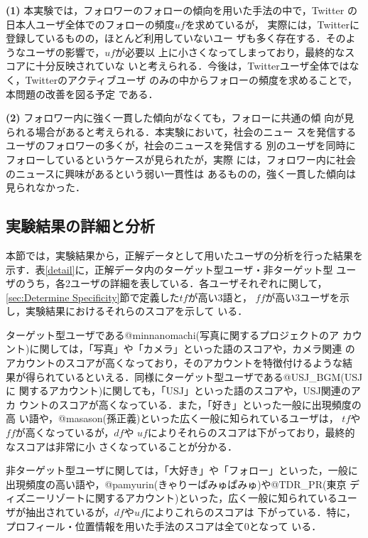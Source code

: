 {\bf(1)} 本実験では，フォロワーのフォローの傾向を用いた手法の中で，Twitter
       の日本人ユーザ全体でのフォローの頻度$\mathit{uf}$を求めているが，
       実際には，Twitterに登録しているものの，ほとんど利用していないユー
       ザも多く存在する．そのようなユーザの影響で，$\mathit{uf}$が必要以
       上に小さくなってしまっており，最終的なスコアに十分反映されていな
       いと考えられる．今後は，Twitterユーザ全体ではなく，Twitterのアクティブユーザ
       のみの中からフォローの頻度を求めることで，本問題の改善を図る予定
       である．\vspace{1ex}

{\bf(2)} フォロワー内に強く一貫した傾向がなくても，フォローに共通の傾
       向が見られる場合があると考えられる．本実験において，社会のニュー
       スを発信するユーザのフォロワーの多くが，社会のニュースを発信する
       別のユーザを同時にフォローしているというケースが見られたが，実際
       には，フォロワー内に社会のニュースに興味があるという弱い一貫性は
       あるものの，強く一貫した傾向は見られなかった．\vspace{1ex}

\subsection{実験結果の詳細と分析}
\label{sec:detail}

本節では，実験結果から，正解データとして用いたユーザの分析を行った結果を
示す．表\ref{detail}に，正解データ内のターゲット型ユーザ・非ターゲット型
ユーザのうち，各2ユーザの詳細を表している．各ユーザそれぞれに関して，
\ref{sec:Determine Specificity}節で定義した$\mathit{tf}$が高い3語と，
$\mathit{ff}$が高い3ユーザを示し，実験結果におけるそれらのスコアを示して
いる．

ターゲット型ユーザである@minnanomachi(写真に関するプロジェクトのア
カウント)に関しては，「写真」や「カメラ」といった語のスコアや，カメラ関連
のアカウントのスコアが高くなっており，そのアカウントを特徴付けるような結
果が得られているといえる．同様にターゲット型ユーザである@USJ\_BGM(USJに
関するアカウント)に関しても，「USJ」といった語のスコアや，USJ関連のアカ
ウントのスコアが高くなっている．また，「好き」といった一般に出現頻度の高
い語や，@masason(孫正義)といった広く一般に知られているユーザは，
$\mathit{tf}$や$\mathit{ff}$が高くなっているが，$\mathit{df}$や
$\mathit{uf}$によりそれらのスコアは下がっており，最終的なスコアは非常に小
さくなっていることが分かる．

非ターゲット型ユーザに関しては，「大好き」や「フォロー」といった，一般に
出現頻度の高い語や，@pamyurin(きゃりーぱみゅぱみゅ)や@TDR\_PR(東京
ディズニーリゾートに関するアカウント)といった，広く一般に知られているユー
ザが抽出されているが，$\mathit{df}$や$\mathit{uf}$によりこれらのスコアは
下がっている．特に，プロフィール・位置情報を用いた手法のスコアは全て0となって
いる．


